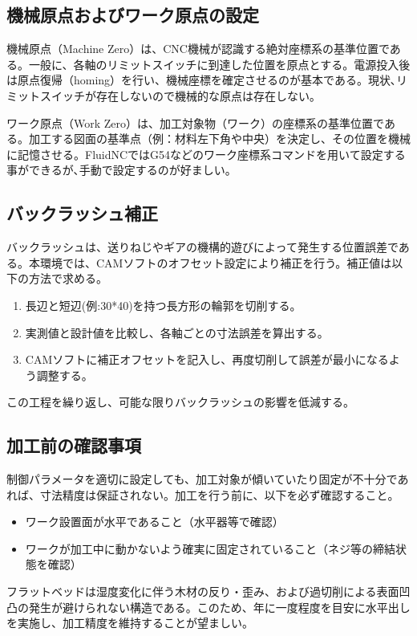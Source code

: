\documentclass[uplatex,dvipdfmx]{ujarticle}
\begin{document}
\subsection{機械原点およびワーク原点の設定}
機械原点（Machine Zero）は、CNC機械が認識する絶対座標系の基準位置である。一般に、各軸のリミットスイッチに到達した位置を原点とする。電源投入後は原点復帰（homing）を行い、機械座標を確定させるのが基本である。現状､リミットスイッチが存在しないので機械的な原点は存在しない｡

ワーク原点（Work Zero）は、加工対象物（ワーク）の座標系の基準位置である。加工する図面の基準点（例：材料左下角や中央）を決定し、その位置を機械に記憶させる。FluidNCではG54などのワーク座標系コマンドを用いて設定する事ができるが､手動で設定するのが好ましい。

\subsection{バックラッシュ補正}
バックラッシュは、送りねじやギアの機構的遊びによって発生する位置誤差である。本環境では、CAMソフトのオフセット設定により補正を行う。補正値は以下の方法で求める。

\begin{enumerate}
    \item 長辺と短辺(例:30*40)を持つ長方形の輪郭を切削する。
    \item 実測値と設計値を比較し、各軸ごとの寸法誤差を算出する。
    \item CAMソフトに補正オフセットを記入し、再度切削して誤差が最小になるよう調整する。
\end{enumerate}

この工程を繰り返し、可能な限りバックラッシュの影響を低減する。

\subsection{加工前の確認事項}
制御パラメータを適切に設定しても、加工対象が傾いていたり固定が不十分であれば、寸法精度は保証されない。加工を行う前に、以下を必ず確認すること。
\begin{itemize}
    \item ワーク設置面が水平であること（水平器等で確認）
    \item ワークが加工中に動かないよう確実に固定されていること（ネジ等の締結状態を確認）
\end{itemize}
フラットベッドは湿度変化に伴う木材の反り・歪み、および過切削による表面凹凸の発生が避けられない構造である。このため、年に一度程度を目安に水平出しを実施し、加工精度を維持することが望ましい。
\end{document}
